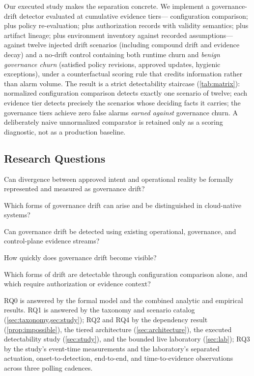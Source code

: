 Our executed study makes the separation concrete. We implement a
governance-drift detector evaluated at cumulative evidence tiers---%
configuration comparison; plus policy re-evaluation; plus authorization
records with validity semantics; plus artifact lineage; plus environment
inventory against recorded assumptions---against twelve injected drift
scenarios (including compound drift and evidence decay) and a no-drift control containing both
runtime churn and \emph{benign governance churn} (satisfied policy
revisions, approved updates, hygienic exceptions), under a counterfactual
scoring rule that credits information rather than alarm volume. The result is
a strict detectability staircase (\cref{tab:matrix}): normalized
configuration comparison detects exactly one scenario of twelve; each evidence
tier detects precisely the scenarios whose deciding facts it carries; the
governance tiers achieve zero false alarms \emph{earned against} governance
churn. A deliberately naive unnormalized comparator is retained only as a
scoring diagnostic, not as a production baseline.

\subsection{Research Questions}
\begin{description}[leftmargin=3.2em,itemsep=1pt,topsep=2pt]
\item[RQ0:] Can divergence between approved intent and operational reality be
formally represented and measured as governance drift?
\item[RQ1:] Which forms of governance drift can arise and be distinguished in
cloud-native systems?
\item[RQ2:] Can governance drift be detected using existing operational,
governance, and control-plane evidence streams?
\item[RQ3:] How quickly does governance drift become visible?
\item[RQ4:] Which forms of drift are detectable through configuration
comparison alone, and which require authorization or evidence context?
\end{description}

RQ0 is answered by the formal model and the combined analytic and empirical
results. RQ1 is answered by the taxonomy and scenario catalog
(\cref{sec:taxonomy,sec:study}); RQ2 and RQ4 by the dependency result (\cref{prop:impossible}), the tiered architecture (\cref{sec:architecture}),
the executed detectability study (\cref{sec:study}), and the bounded live
laboratory (\cref{sec:lab}); RQ3 by the study's event-time measurements and
the laboratory's separated actuation, onset-to-detection, end-to-end, and
time-to-evidence observations across three polling cadences.


